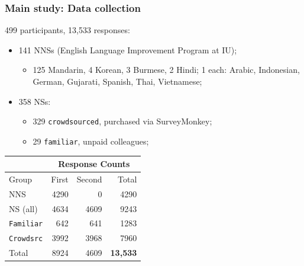 \documentclass[handout,xcolor={dvipsnames}]{beamer}
\newcommand{\param}[1]{\texttt{#1}}
\begin{document}
\begin{frame}
\frametitle{Main study: Data collection}
\vspace{.5em}
499 participants, 13,533 responses:
\pause
\begin{itemize}
\pause
\item 141 NNSs (English Language Improvement Program at IU);
\begin{itemize}
\pause
\item 125 Mandarin, 4 Korean, 3 Burmese, 2 Hindi; 1 each: Arabic, Indonesian, German, Gujarati, Spanish, Thai, Vietnamese;
\end{itemize}
\vspace{.2em}
\pause
\item 358 NSs:
\begin{itemize}
\pause
\item 329 \param{crowdsourced}, purchased via SurveyMonkey;
\pause
\item 29 \param{familiar}, unpaid colleagues;
\end{itemize}
\end{itemize}

\vspace{-.2em}
\begin{small}
\begin{table}[htb!]
\begin{center}
\begin{tabular}{|l||r|r||r|}
\hline
& \multicolumn{3}{c|}{Response Counts} \\
\hline
 Group & First & Second & Total \\
\hline
\hline
NNS & 4290 & 0 & 4290 \\
\hline
\hline
NS (all) & 4634 & 4609 & 9243 \\ %
\hline
\multicolumn{1}{|r||}{\param{Familiar}} & 642 & 641 & 1283 \\ 
\hline
\multicolumn{1}{|r||}{\param{Crowdsrc}} & 3992 & 3968 & 7960 \\
\hline
\hline
Total & 8924 & 4609 & \textbf{13,533} \\
\hline
\end{tabular}
\end{center}
\end{table}
\end{small}

\end{frame}
\end{document}
